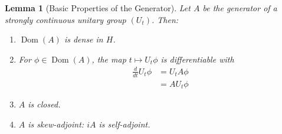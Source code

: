 \documentclass{article}
\newcommand{\tmop}[1]{\ensuremath{\operatorname{#1}}}
\newtheorem{lemma}{Lemma}
\newcommand{\1}{\mathbbm{1}}
\newcommand{\Dom}{\tmop{Dom}}
\begin{document}
\begin{lemma}
  [Basic Properties of the Generator]\label{lem:generator_properties} Let $A$
  be the generator of a strongly continuous unitary group $(U_t)$. Then:
  \begin{enumerate}
    \item $\Dom (A)$ is dense in $H$.
    
    \item For $\phi \in \Dom (A)$, the map $t \mapsto U_t \phi$ is
    differentiable with
    \begin{equation}
      \begin{array}{ll}
        \frac{d}{dt} U_t \phi & = U_t A \phi\\
        & = AU_t \phi
      \end{array}
    \end{equation}
    \item $A$ is closed.
    
    \item $A$ is skew-adjoint: $iA$ is self-adjoint.
  \end{enumerate}
\end{lemma}
\end{document}
